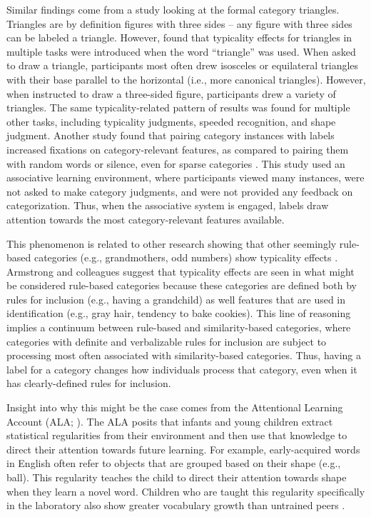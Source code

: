 \documentclass[../dissertation.tex]{subfiles}
\begin{document}
	 Similar findings come from a study looking at the formal category triangles. Triangles are by definition figures with three sides – any figure with three sides can be labeled a triangle. However, \citet{Lupyan2017} found that typicality effects for triangles in multiple tasks were introduced when the word “triangle” was used. When asked to draw a triangle, participants most often drew isosceles or equilateral triangles with their base parallel to the horizontal (i.e., more canonical triangles). However, when instructed to draw a three-sided figure, participants drew a variety of triangles. The same typicality-related pattern of results was found for multiple other tasks, including typicality judgments, speeded recognition, and shape judgment. Another study found that pairing category instances with labels increased fixations on category-relevant features, as compared to pairing them with random words or silence, even for sparse categories \citep{Barnhart2018}. This study used an associative learning environment, where participants viewed many instances, were not asked to make category judgments, and were not provided any feedback on categorization. Thus, when the associative system is engaged, labels draw attention towards the most category-relevant features available. \par
	  This phenomenon is related to other research showing that other seemingly rule-based categories (e.g., grandmothers, odd numbers) show typicality effects \citep{Armstrong1983,Lupyan2013a}. Armstrong and colleagues suggest that typicality effects are seen in what might be considered rule-based categories because these categories are defined both by rules for inclusion (e.g., having a grandchild) as well features that are used in identification (e.g., gray hair, tendency to bake cookies). This line of reasoning implies a continuum between rule-based and similarity-based categories, where categories with definite and verbalizable rules for inclusion are subject to processing most often associated with similarity-based categories. Thus, having a label for a category changes how individuals process that category, even when it has clearly-defined rules for inclusion. \par
	Insight into why this might be the case comes from the Attentional Learning Account (ALA; \citealp{Smith2002,Yoshida2005}). The ALA posits that infants and young children extract statistical regularities from their environment and then use that knowledge to direct their attention towards future learning. For example, early-acquired words in English often refer to objects that are grouped based on their shape (e.g., ball). This regularity teaches the child to direct their attention towards shape when they learn a novel word. Children who are taught this regularity specifically in the laboratory also show greater vocabulary growth than untrained peers \citep{Smith2002}. \par
\end{document}
